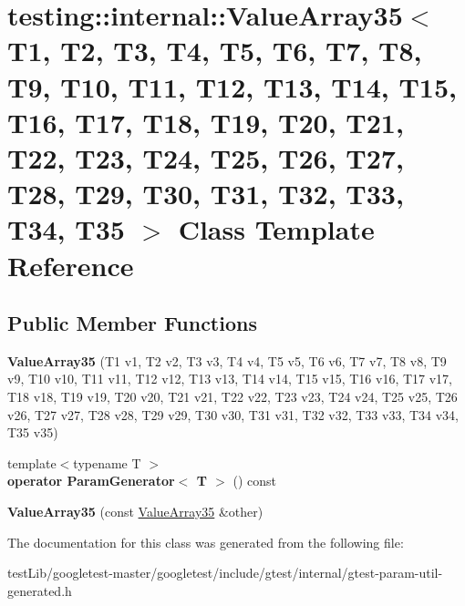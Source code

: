 \hypertarget{classtesting_1_1internal_1_1ValueArray35}{}\section{testing\+:\+:internal\+:\+:Value\+Array35$<$ T1, T2, T3, T4, T5, T6, T7, T8, T9, T10, T11, T12, T13, T14, T15, T16, T17, T18, T19, T20, T21, T22, T23, T24, T25, T26, T27, T28, T29, T30, T31, T32, T33, T34, T35 $>$ Class Template Reference}
\label{classtesting_1_1internal_1_1ValueArray35}
\subsection*{Public Member Functions}
\begin{DoxyCompactItemize}
\item 
\mbox{\label{classtesting_1_1internal_1_1ValueArray35_a1aa394b77ee6359766921841ae15e6fa}} 
{\bfseries Value\+Array35} (T1 v1, T2 v2, T3 v3, T4 v4, T5 v5, T6 v6, T7 v7, T8 v8, T9 v9, T10 v10, T11 v11, T12 v12, T13 v13, T14 v14, T15 v15, T16 v16, T17 v17, T18 v18, T19 v19, T20 v20, T21 v21, T22 v22, T23 v23, T24 v24, T25 v25, T26 v26, T27 v27, T28 v28, T29 v29, T30 v30, T31 v31, T32 v32, T33 v33, T34 v34, T35 v35)
\item 
\mbox{\label{classtesting_1_1internal_1_1ValueArray35_a6cb4565a74e41817523484cd35df5a71}} 
{\footnotesize template$<$typename T $>$ }\\{\bfseries operator Param\+Generator$<$ T $>$} () const
\item 
\mbox{\label{classtesting_1_1internal_1_1ValueArray35_a0deb515bc0893c9b1611a4c6b49003d8}} 
{\bfseries Value\+Array35} (const \hyperlink{classtesting_1_1internal_1_1ValueArray35}{Value\+Array35} \&other)
\end{DoxyCompactItemize}


The documentation for this class was generated from the following file\+:\begin{DoxyCompactItemize}
\item 
test\+Lib/googletest-\/master/googletest/include/gtest/internal/gtest-\/param-\/util-\/generated.\+h\end{DoxyCompactItemize}
